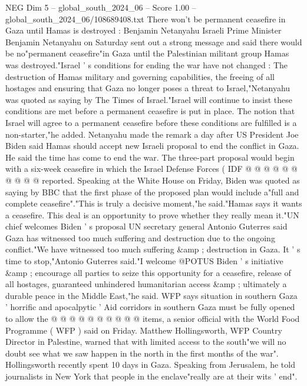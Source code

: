 \begin{textsample}{NEG Dim 5 – global\_south\_2024\_06 – Score 1.00 – global\_south\_2024\_06/108689408.txt}  \label{ex:f5_neg_225}
There won't be permanent ceasefire in Gaza until Hamas is destroyed : Benjamin Netanyahu Israeli Prime Minister Benjamin Netanyahu on Saturday sent out a strong message and said there would be no"permanent ceasefire"in Gaza until the Palestinian militant group Hamas was destroyed."Israel ' s conditions for ending the war have not changed : The destruction of Hamas military and governing capabilities, the freeing of all hostages and ensuring that Gaza no longer poses a threat to Israel,"Netanyahu was quoted as saying by The Times of Israel."Israel will continue to insist these conditions are met before a permanent ceasefire is put in place.
The notion that Israel will agree to a permanent ceasefire before these conditions are fulfilled is a non-starter,"he added.
Netanyahu made the remark a day after US President Joe Biden said Hamas should accept new Israeli proposal to end the conflict in Gaza.
He said the time has come to end the war.
The three-part proposal would begin with a six-week ceasefire in which the Israel Defense Forces ( IDF @ @ @ @ @ @ @ @ @ @ reported.
Speaking at the White House on Friday, Biden was quoted as saying by BBC that the first phase of the proposed plan would include a"full and complete ceasefire"."This is truly a decisive moment,"he said."Hamas says it wants a ceasefire.
This deal is an opportunity to prove whether they really mean it."UN chief welcomes Biden ' s proposal UN secretary general Antonio Guterres said Gaza has witnessed too much suffering and destruction due to the ongoing conflict."We have witnessed too much suffering \&amp ; destruction in Gaza.
It ' s time to stop,"Antonio Guterres said."I welcome @POTUS Biden ' s initiative \&amp ; encourage all parties to seize this opportunity for a ceasefire, release of all hostages, guaranteed unhindered humanitarian access \&amp ; ultimately a durable peace in the Middle East,"he said.
WFP says situation in southern Gaza ' horrific and apocalpytic ' Aid corridors in southern Gaza must be fully opened to allow the @ @ @ @ @ @ @ @ @ @ items, a senior official with the World Food Programme ( WFP ) said on Friday.
Matthew Hollingsworth, WFP Country Director in Palestine, warned that with limited access to the south"we will no doubt see what we saw happen in the north in the first months of the war".
Hollingsworth recently spent 10 days in Gaza.
Speaking from Jerusalem, he told journalists in New York that people in the enclave"really are at their wits ' end".

\end{textsample}

